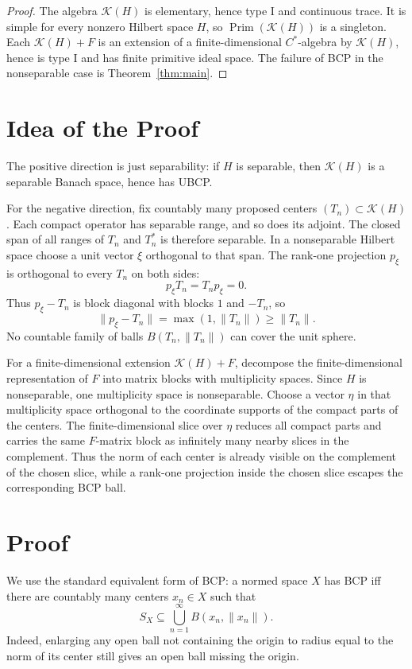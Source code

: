 \documentclass[11pt]{article}
\newcommand{\Kcal}{\mathcal K}
\newcommand{\Prim}{\operatorname{Prim}}
\begin{document}
\begin{proof}
The algebra \(\Kcal(H)\) is elementary, hence type I and continuous trace.
It is simple for every nonzero Hilbert space \(H\), so \(\Prim(\Kcal(H))\) is
a singleton.  Each \(\Kcal(H)+F\) is an extension of a finite-dimensional
\(C^*\)-algebra by \(\Kcal(H)\), hence is type I and has finite primitive
ideal space.  The failure of BCP in the nonseparable case is
Theorem~\ref{thm:main}.
\end{proof}

\section*{Idea of the Proof}

The positive direction is just separability: if \(H\) is separable, then
\(\Kcal(H)\) is a separable Banach space, hence has UBCP.

For the negative direction, fix countably many proposed centers
\((T_n)\subset \Kcal(H)\).  Each compact operator has separable range, and so
does its adjoint.  The closed span of all ranges of \(T_n\) and \(T_n^*\) is
therefore separable.  In a nonseparable Hilbert space choose a unit vector
\(\xi\) orthogonal to that span.  The rank-one projection \(p_\xi\) is
orthogonal to every \(T_n\) on both sides:
\[
        p_\xi T_n=T_n p_\xi=0.
\]
Thus \(p_\xi-T_n\) is block diagonal with blocks \(1\) and \(-T_n\), so
\[
        \|p_\xi-T_n\|=\max(1,\|T_n\|)\ge \|T_n\|.
\]
No countable family of balls \(B(T_n,\|T_n\|)\) can cover the unit sphere.

For a finite-dimensional extension \(\Kcal(H)+F\), decompose the
finite-dimensional representation of \(F\) into matrix blocks with
multiplicity spaces.  Since \(H\) is nonseparable, one multiplicity space is
nonseparable.  Choose a vector \(\eta\) in that multiplicity space orthogonal
to the coordinate supports of the compact parts of the centers.  The
finite-dimensional slice over \(\eta\) reduces all compact parts and carries
the same \(F\)-matrix block as infinitely many nearby slices in the complement.
Thus the norm of each center is already visible on the complement of the
chosen slice, while a rank-one projection inside the chosen slice escapes the
corresponding BCP ball.

\section*{Proof}

We use the standard equivalent form of BCP: a normed space \(X\) has BCP iff
there are countably many centers \(x_n\in X\) such that
\[
        S_X\subseteq \bigcup_{n=1}^\infty B(x_n,\|x_n\|).
\]
Indeed, enlarging any open ball not containing the origin to radius equal to
the norm of its center still gives an open ball missing the origin.
\end{document}
